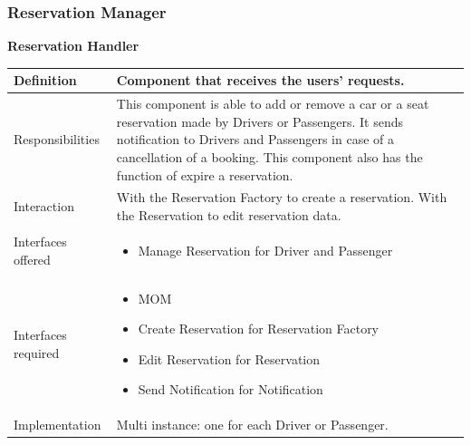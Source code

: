 \documentclass{article}
\begin{document}
			
			\pagebreak
			\subsubsection{Reservation Manager}
			\begin{minipage}{\linewidth}
			\end{minipage}
			\begin{center}
				\centerline{\textbf{Reservation Handler}}	
				\begin{tabular}{| l | p{9cm} |}\hline
					Definition & Component that receives the users' requests.\\\hline
					Responsibilities & This component is able to add or remove a car or a seat reservation made by Drivers or Passengers. It sends notification to Drivers and Passengers in case of a cancellation of a booking. This component also has the function of expire a reservation.\\\hline
					Interaction & With the Reservation Factory to create a reservation. With the Reservation to edit reservation data. \\\hline
					Interfaces offered & \begin{itemize}
						\item Manage Reservation for Driver and Passenger
					\end{itemize}\\\hline
					Interfaces required & \begin{itemize}
						\item MOM
						\item Create Reservation for Reservation Factory
						\item Edit Reservation for Reservation
						\item Send Notification for Notification
					\end{itemize}\\\hline
					Implementation & Multi instance: one for each Driver or Passenger.\\\hline
				\end{tabular}
			\end{center}
\end{document}
